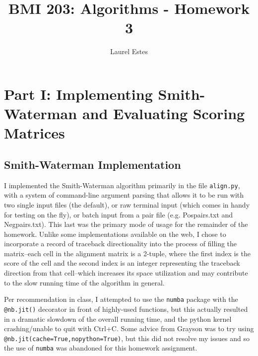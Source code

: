 \documentclass{article}
\begin{document}
\title{BMI 203: Algorithms - Homework 3}
\author{Laurel Estes}
\maketitle
\section{Part I: Implementing Smith-Waterman and Evaluating Scoring Matrices}

\subsection{Smith-Waterman Implementation}
I implemented the Smith-Waterman algorithm primarily in the file \verb|align.py|, with a system of command-line argument parsing that allows it to be run with two single input files (the default), or raw terminal input (which comes in handy for testing on the fly), or batch input from a pair file (e.g. Pospairs.txt and Negpairs.txt). This last was the primary mode of usage for the remainder of the homework. Unlike some implementations available on the web, I chose to incorporate a record of traceback directionality into the process of filling the matrix--each cell in the alignment matrix is a 2-tuple, where the first index is the score of the cell and the second index is an integer representing the traceback direction from that cell--which increases its space utilization and may contribute to the slow running time of the algorithm in general.
\par Per recommendation in class, I attempted to use the \verb|numba| package with the \verb|@nb.jit()| decorator in front of highly-used functions, but this actually resulted in a dramatic slowdown of the overall running time, and the python kernel crashing/unable to quit with Ctrl+C. Some advice from Grayson was to try using \verb|@nb.jit(cache=True,nopython=True)|, but this did not resolve my issues and so the use of \verb|numba| was abandoned for this homework assignment.
\end{document}
